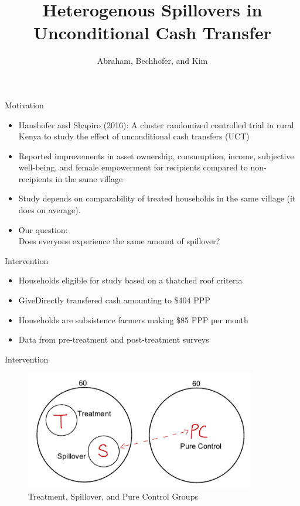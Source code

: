 \documentclass[14pt, aspectratio=169]{beamer}
\title[Heteregenous Spillovers in Unconditional Cash Transfer] %
{Heterogenous Spillovers in Unconditional Cash Transfer}
\author[Abraham, Bechhofer, and Kim] %
{Abraham, Bechhofer, and Kim }
\begin{document}
\begin{frame}
  \titlepage
\end{frame}

\begin{frame}{Motivation}
\begin{itemize}
	\item Haushofer and Shapiro (2016): A cluster randomized controlled trial in rural Kenya to study the effect of unconditional cash transfers (UCT)
    \item Reported improvements in asset ownership, consumption, income, subjective well-being, and female empowerment for recipients compared to non-recipients in the same village
    \item Study depends on comparability of treated households in the same village (it does on average).
	\item Our question: \\ Does everyone experience the same amount of spillover?
\end{itemize}
\end{frame}

\begin{frame}{Intervention}
    \begin{itemize}
    	\item Households eligible for study based on a thatched roof criteria
        \item GiveDirectly transfered cash amounting to \$404 PPP
        \item Households are subsistence farmers making \$85 PPP per month
        \item Data from pre-treatment and post-treatment surveys
    \end{itemize}
\end{frame}

\begin{frame}{Intervention}
\begin{figure}[H]
	\centering
	\includegraphics[width=0.9\textwidth]{design.png}
	\caption{Treatment, Spillover, and Pure Control Groups}
\end{figure}
\end{frame}
\end{document}
